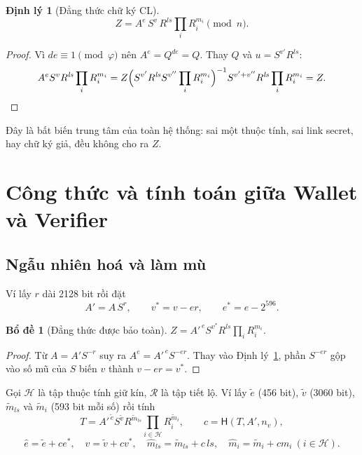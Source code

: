 \documentclass[a4paper,11pt,oneside]{report}
\theoremstyle{definition}
\theoremstyle{plain}
\newtheorem{theorem}[definition]{Định lý}
\newtheorem{lemma}[definition]{Bổ đề}
\newcommand{\Hid}{\mathcal{H}}
\newcommand{\Rev}{\mathcal{R}}
\newcommand{\Hash}{\mathsf{H}}
\begin{document}
\begin{theorem}[Đẳng thức chữ ký CL]
\label{thm:cl}
\begin{equation}
Z = A^{e}\, S^{v}\, R^{\mathit{ls}} \prod_i R_i^{m_i} \pmod n .
\end{equation}
\end{theorem}

\begin{proof}
Vì $de \equiv 1 \pmod{\varphi}$ nên $A^{e} = Q^{de} = Q$. Thay $Q$ và
$u = S^{v'} R^{\mathit{ls}}$:
\[
A^{e} S^{v} R^{\mathit{ls}} \prod_i R_i^{m_i}
= Z \Bigl(S^{v'} R^{\mathit{ls}} S^{v''} \prod_i R_i^{m_i}\Bigr)^{-1}
  S^{v' + v''} R^{\mathit{ls}} \prod_i R_i^{m_i} = Z . \qedhere
\]
\end{proof}

Đây là bất biến trung tâm của toàn hệ thống: sai một thuộc tính, sai
link secret, hay chữ ký giả, đều không cho ra $Z$.

\section{Công thức và tính toán giữa Wallet và Verifier}

\subsection{Ngẫu nhiên hoá và làm mù}

Ví lấy $r$ dài 2128 bit rồi đặt
\begin{equation}
A' = A\,S^{r}, \qquad v^{*} = v - er, \qquad e^{*} = e - 2^{596}.
\end{equation}

\begin{lemma}[Đẳng thức được bảo toàn]
\label{lem:rerand}
$Z = A'^{\,e} S^{v^{*}} R^{\mathit{ls}} \prod_i R_i^{m_i}$.
\end{lemma}

\begin{proof}
Từ $A = A' S^{-r}$ suy ra $A^{e} = A'^{\,e} S^{-er}$. Thay vào Định lý~\ref{thm:cl}, phần
$S^{-er}$ gộp vào số mũ của $S$ biến $v$ thành $v - er = v^{*}$.
\end{proof}

Gọi $\Hid$ là tập thuộc tính giữ kín, $\Rev$ là tập tiết lộ. Ví lấy $\tilde e$ (456 bit),
$\tilde v$ (3060 bit), $\tilde m_{\mathit{ls}}$ và $\tilde m_i$ (593 bit mỗi số) rồi tính
\begin{equation}
T = A'^{\,\tilde e} S^{\tilde v} R^{\tilde m_{\mathit{ls}}} \prod_{i \in \Hid} R_i^{\tilde m_i},
\qquad c = \Hash(T, A', n_v),
\end{equation}
\[
\hat e = \tilde e + c e^{*}, \quad
\hat v = \tilde v + c v^{*}, \quad
\hat m_{\mathit{ls}} = \tilde m_{\mathit{ls}} + c\,\mathit{ls}, \quad
\hat m_i = \tilde m_i + c m_i \ (i \in \Hid).
\]
\end{document}
